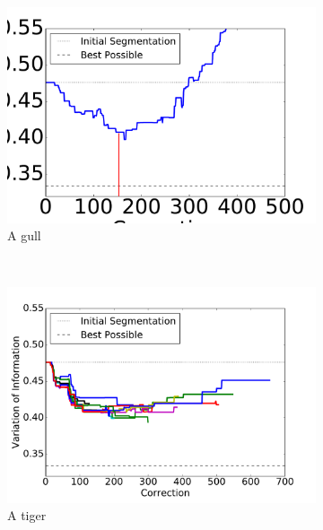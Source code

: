 \begin{figure}
    \centering
    \begin{subfigure}[b]{0.24\textwidth}
        \includegraphics[width=\textwidth]{gfx/gpauto.pdf}
        \caption{A gull}
        \label{fig:gull}
    \end{subfigure}
    ~ %
    \begin{subfigure}[b]{0.24\textwidth}
        \includegraphics[width=\textwidth]{gfx/gpusers.pdf}
        \caption{A tiger}
        \label{fig:tiger}
    \end{subfigure}
    \begin{subfigure}[b]{0.24\textwidth}

\end{subfigure}
\end{figure}
